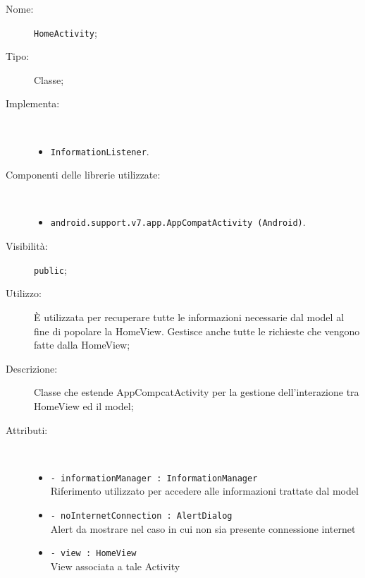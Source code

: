 \documentclass[../DefinizioneDiProdotto.tex]{subfiles}
\begin{document}
\begin{description}
	\item[Nome:] \texttt{HomeActivity};
	\item[Tipo:] Classe;
	\item[Implementa:] \
	\begin{itemize}
		\item \texttt{InformationListener}.
		
	\end{itemize}
	\item[Componenti delle librerie utilizzate:] \
	\begin{itemize}
		\item \texttt{android.support.v7.app.AppCompatActivity (Android)}.
		
	\end{itemize}
	\item[Visibilità:] \texttt{public};
	\item[Utilizzo:] È utilizzata per recuperare tutte le informazioni necessarie dal model al fine di popolare la HomeView. Gestisce anche tutte le richieste che vengono fatte dalla HomeView;
	\item[Descrizione:] Classe che estende AppCompcatActivity per la gestione dell'interazione tra HomeView ed il model;
	\item[Attributi:] \
	\begin{itemize}
		\item \texttt{- informationManager : InformationManager}\\
		Riferimento utilizzato per accedere alle informazioni trattate dal model
		
		\item \texttt{- noInternetConnection : AlertDialog}\\
		Alert da mostrare nel caso in cui non sia presente connessione internet
		
		\item \texttt{- view : HomeView}\\
		View associata a tale Activity
		

\end{itemize}
\end{description}
\end{document}
